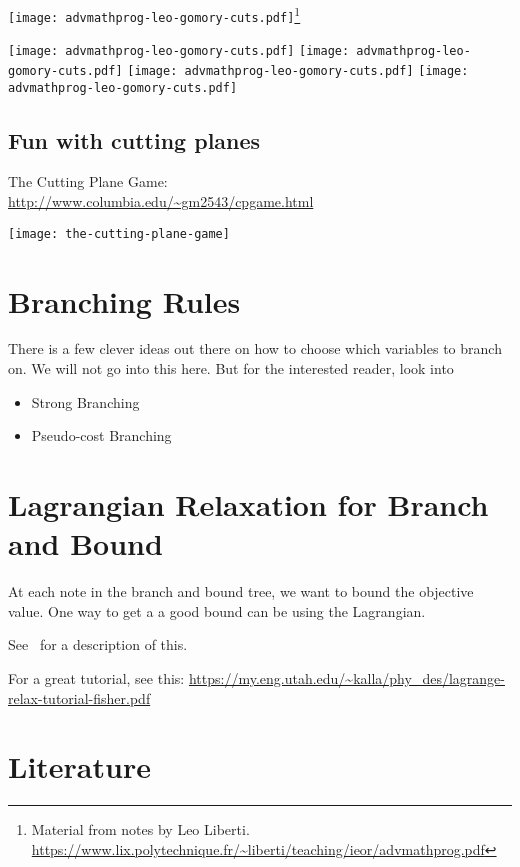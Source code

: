 \documentclass[../open-optimization/open-optimization.tex]{subfiles}
\begin{document}
\texttt{[image: advmathprog-leo-gomory-cuts.pdf]}\footnote{Material from notes by Leo Liberti. \url{https://www.lix.polytechnique.fr/~liberti/teaching/ieor/advmathprog.pdf}}
\newpage

\texttt{[image: advmathprog-leo-gomory-cuts.pdf]}
\texttt{[image: advmathprog-leo-gomory-cuts.pdf]}
\texttt{[image: advmathprog-leo-gomory-cuts.pdf]}
\texttt{[image: advmathprog-leo-gomory-cuts.pdf]}
\subsection{Fun with cutting planes}
The Cutting Plane Game:\\
\url{http://www.columbia.edu/~gm2543/cpgame.html}

\texttt{[image: the-cutting-plane-game]}



\section{Branching Rules}
There is a few clever ideas out there on how to choose which variables to branch on.  We will not go into this here.  But for the interested reader, look into 
\begin{itemize}
\item Strong Branching
\item Pseudo-cost Branching
\end{itemize}

\section{Lagrangian Relaxation for Branch and Bound}

At each note in the branch and bound tree, we want to bound the objective value.  One way to get a a good bound can be using the Lagrangian. 

See~\cite{Fisher2004} for a description of this.

For a great tutorial, see this: 
 \url{https://my.eng.utah.edu/~kalla/phy_des/lagrange-relax-tutorial-fisher.pdf}


\section{Literature}
\end{document}
